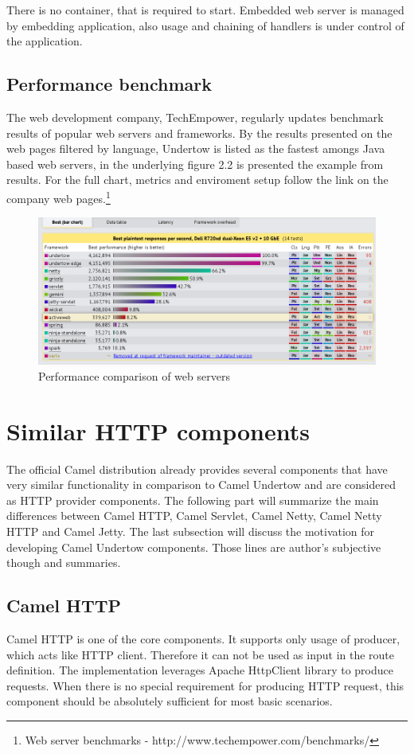 \documentclass[12pt,final,oneside]{fithesis2}
\begin{document}
There is no container, that is required to start. Embedded web server is managed by embedding application, also usage and chaining of handlers is under control of the application. 

\subsection{Performance benchmark}

The web development company, TechEmpower, regularly updates benchmark results of popular web servers and frameworks. By the results presented on the web pages filtered by language, Undertow is listed as the fastest amongs Java based web servers, in the underlying figure 2.2 is presented the example from results. For the full chart, metrics and enviroment setup follow the link on the company web pages.\footnote{Web server benchmarks - http://www.techempower.com/benchmarks/}

\begin{figure}[!h]
\centering
\includegraphics[width=1\linewidth]{images/undertow_benchmark.png}
\caption{Performance comparison of web servers}
\end{figure}

\newpage

\section{Similar HTTP components}
The official Camel distribution already provides several components that have very similar functionality in comparison to Camel Undertow and are considered as HTTP provider components. The following part  will summarize the main differences between Camel HTTP, Camel Servlet, Camel Netty, Camel Netty HTTP and Camel Jetty. The last subsection will discuss the motivation for developing Camel Undertow components. Those lines are author's subjective though and summaries. 

\subsection{Camel HTTP}
Camel HTTP is one of the core components. It supports only usage of producer, which acts like HTTP client. Therefore it can not be used as input in the route definition. The implementation leverages Apache HttpClient library to produce requests. When there is no special requirement for producing HTTP request, this component should be absolutely sufficient for most basic scenarios. 
\end{document}
